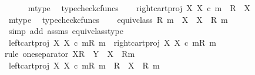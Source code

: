 \begin{isabellebody}
\ \ \ \ \isamarkupfalse%
\ m{\isacharunderscore}{\kern0pt}type\ \isamarkupfalse%
\ typecheck{\isacharunderscore}{\kern0pt}cfuncs\isanewline
\ \ \isamarkupfalse%
\ {\isachardoublequoteopen}right{\isacharunderscore}{\kern0pt}cart{\isacharunderscore}{\kern0pt}proj\ X\ X\ {\isasymcirc}\isactrlsub c\ m\ {\isacharcolon}{\kern0pt}\ R\ {\isasymrightarrow}\ X{\isachardoublequoteclose}\isanewline
\ \ \ \ \isamarkupfalse%
\ m{\isacharunderscore}{\kern0pt}type\ \isamarkupfalse%
\ typecheck{\isacharunderscore}{\kern0pt}cfuncs\isanewline
\ \ \isamarkupfalse%
\ {\isachardoublequoteopen}equiv{\isacharunderscore}{\kern0pt}class\ {\isacharparenleft}{\kern0pt}R{\isacharcomma}{\kern0pt}\ m{\isacharparenright}{\kern0pt}\ {\isacharcolon}{\kern0pt}\ X\ {\isasymrightarrow}\ X\ {\isasymsslash}\ {\isacharparenleft}{\kern0pt}R{\isacharcomma}{\kern0pt}\ m{\isacharparenright}{\kern0pt}{\isachardoublequoteclose}\isanewline
\ \ \ \ \isamarkupfalse%
\ {\isacharparenleft}{\kern0pt}simp\ add{\isacharcolon}{\kern0pt}\ assms\ equiv{\isacharunderscore}{\kern0pt}class{\isacharunderscore}{\kern0pt}type{\isacharparenright}{\kern0pt}\isanewline
\ \ \isamarkupfalse%
\ {\isachardoublequoteopen}{\isacharbrackleft}{\kern0pt}left{\isacharunderscore}{\kern0pt}cart{\isacharunderscore}{\kern0pt}proj\ X\ X\ {\isasymcirc}\isactrlsub c\ m{\isacharbrackright}{\kern0pt}\isactrlbsub {\isacharparenleft}{\kern0pt}R{\isacharcomma}{\kern0pt}\ m{\isacharparenright}{\kern0pt}\isactrlesub \ {\isacharequal}{\kern0pt}\ {\isacharbrackleft}{\kern0pt}right{\isacharunderscore}{\kern0pt}cart{\isacharunderscore}{\kern0pt}proj\ X\ X\ {\isasymcirc}\isactrlsub c\ m{\isacharbrackright}{\kern0pt}\isactrlbsub {\isacharparenleft}{\kern0pt}R{\isacharcomma}{\kern0pt}\ m{\isacharparenright}{\kern0pt}\isactrlesub {\isachardoublequoteclose}\isanewline
\ \ \isamarkupfalse%
{\isacharparenleft}{\kern0pt}rule\ one{\isacharunderscore}{\kern0pt}separator{\isacharbrackleft}{\kern0pt}\ X{\isacharequal}{\kern0pt}{\isachardoublequoteopen}R{\isachardoublequoteclose}{\isacharcomma}{\kern0pt}\ \ Y\ {\isacharequal}{\kern0pt}\ {\isachardoublequoteopen}X\ {\isasymsslash}\ {\isacharparenleft}{\kern0pt}R{\isacharcomma}{\kern0pt}m{\isacharparenright}{\kern0pt}{\isachardoublequoteclose}{\isacharbrackright}{\kern0pt}{\isacharparenright}{\kern0pt}\isanewline
\ \ \ \ \isamarkupfalse%
\ {\isachardoublequoteopen}{\isacharbrackleft}{\kern0pt}left{\isacharunderscore}{\kern0pt}cart{\isacharunderscore}{\kern0pt}proj\ X\ X\ {\isasymcirc}\isactrlsub c\ m{\isacharbrackright}{\kern0pt}\isactrlbsub {\isacharparenleft}{\kern0pt}R{\isacharcomma}{\kern0pt}\ m{\isacharparenright}{\kern0pt}\isactrlesub \ {\isacharcolon}{\kern0pt}\ R\ {\isasymrightarrow}\ X\ {\isasymsslash}\ {\isacharparenleft}{\kern0pt}R{\isacharcomma}{\kern0pt}\ m{\isacharparenright}{\kern0pt}{\isachardoublequoteclose}\isanewline

\end{isabellebody}
